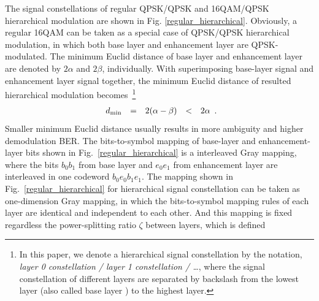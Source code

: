 \documentclass[10pt,fleqn, twocolumn]{IEEEtran}
\begin{document}
\begin{figure}
\end{figure}
The signal constellations of regular QPSK/QPSK and 16QAM/QPSK
hierarchical modulation are shown in Fig.
\ref{regular_hierarchical}. Obviously, a regular 16QAM can be
taken as a special case of QPSK/QPSK hierarchical modulation, in
which both base layer and enhancement layer are QPSK-modulated.
The minimum Euclid distance of base layer and enhancement layer
are denoted by $2\alpha$ and $2\beta$, individually. With
superimposing base-layer signal and enhancement layer signal
together, the minimum Euclid distance of resulted hierarchical
modulation becomes~\footnote{In this paper, we denote a
hierarchical signal constellation by the notation, {\em layer 0
constellation / layer 1 constellation / \ldots}, where the signal
constellation of different layers are separated by backslash from
the lowest layer (also called base layer ) to the highest layer. }
\begin{equation}
\begin{array}{rcccl}
d_{\rm min}& = & 2(\alpha-\beta) & <& 2\alpha
\end{array}.\label{Regular_MED}
\end{equation}
\noindent Smaller minimum Euclid distance usually results in more
ambiguity and higher demodulation BER. The bits-to-symbol mapping
of base-layer and enhancement-layer bits shown in
Fig.~\ref{regular_hierarchical} is a interleaved Gray mapping,
where the bits $b_{0}b_{1}$ from base layer and $e_{0}e_{1}$ from
enhancement layer are interleaved in one codeword
$b_{0}e_{0}b_{1}e_{1}$. The mapping shown in
Fig.~\ref{regular_hierarchical} for hierarchical signal
constellation can be taken as one-dimension Gray mapping, in which
the bits-to-symbol mapping rules of each layer are identical and
independent to each other. And this mapping is fixed regardless
the power-splitting ratio $\zeta$ between layers, which is defined
\end{document}
